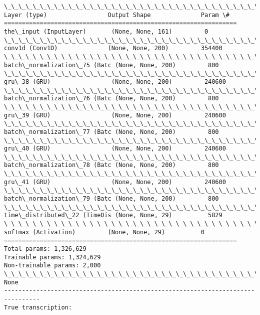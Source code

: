 \documentclass[11pt]{article}
\begin{document}
    \begin{Verbatim}[commandchars=\\\{\}]
\_\_\_\_\_\_\_\_\_\_\_\_\_\_\_\_\_\_\_\_\_\_\_\_\_\_\_\_\_\_\_\_\_\_\_\_\_\_\_\_\_\_\_\_\_\_\_\_\_\_\_\_\_\_\_\_\_\_\_\_\_\_\_\_\_
Layer (type)                 Output Shape              Param \#   
=================================================================
the\_input (InputLayer)       (None, None, 161)         0         
\_\_\_\_\_\_\_\_\_\_\_\_\_\_\_\_\_\_\_\_\_\_\_\_\_\_\_\_\_\_\_\_\_\_\_\_\_\_\_\_\_\_\_\_\_\_\_\_\_\_\_\_\_\_\_\_\_\_\_\_\_\_\_\_\_
conv1d (Conv1D)              (None, None, 200)         354400    
\_\_\_\_\_\_\_\_\_\_\_\_\_\_\_\_\_\_\_\_\_\_\_\_\_\_\_\_\_\_\_\_\_\_\_\_\_\_\_\_\_\_\_\_\_\_\_\_\_\_\_\_\_\_\_\_\_\_\_\_\_\_\_\_\_
batch\_normalization\_75 (Batc (None, None, 200)         800       
\_\_\_\_\_\_\_\_\_\_\_\_\_\_\_\_\_\_\_\_\_\_\_\_\_\_\_\_\_\_\_\_\_\_\_\_\_\_\_\_\_\_\_\_\_\_\_\_\_\_\_\_\_\_\_\_\_\_\_\_\_\_\_\_\_
gru\_38 (GRU)                 (None, None, 200)         240600    
\_\_\_\_\_\_\_\_\_\_\_\_\_\_\_\_\_\_\_\_\_\_\_\_\_\_\_\_\_\_\_\_\_\_\_\_\_\_\_\_\_\_\_\_\_\_\_\_\_\_\_\_\_\_\_\_\_\_\_\_\_\_\_\_\_
batch\_normalization\_76 (Batc (None, None, 200)         800       
\_\_\_\_\_\_\_\_\_\_\_\_\_\_\_\_\_\_\_\_\_\_\_\_\_\_\_\_\_\_\_\_\_\_\_\_\_\_\_\_\_\_\_\_\_\_\_\_\_\_\_\_\_\_\_\_\_\_\_\_\_\_\_\_\_
gru\_39 (GRU)                 (None, None, 200)         240600    
\_\_\_\_\_\_\_\_\_\_\_\_\_\_\_\_\_\_\_\_\_\_\_\_\_\_\_\_\_\_\_\_\_\_\_\_\_\_\_\_\_\_\_\_\_\_\_\_\_\_\_\_\_\_\_\_\_\_\_\_\_\_\_\_\_
batch\_normalization\_77 (Batc (None, None, 200)         800       
\_\_\_\_\_\_\_\_\_\_\_\_\_\_\_\_\_\_\_\_\_\_\_\_\_\_\_\_\_\_\_\_\_\_\_\_\_\_\_\_\_\_\_\_\_\_\_\_\_\_\_\_\_\_\_\_\_\_\_\_\_\_\_\_\_
gru\_40 (GRU)                 (None, None, 200)         240600    
\_\_\_\_\_\_\_\_\_\_\_\_\_\_\_\_\_\_\_\_\_\_\_\_\_\_\_\_\_\_\_\_\_\_\_\_\_\_\_\_\_\_\_\_\_\_\_\_\_\_\_\_\_\_\_\_\_\_\_\_\_\_\_\_\_
batch\_normalization\_78 (Batc (None, None, 200)         800       
\_\_\_\_\_\_\_\_\_\_\_\_\_\_\_\_\_\_\_\_\_\_\_\_\_\_\_\_\_\_\_\_\_\_\_\_\_\_\_\_\_\_\_\_\_\_\_\_\_\_\_\_\_\_\_\_\_\_\_\_\_\_\_\_\_
gru\_41 (GRU)                 (None, None, 200)         240600    
\_\_\_\_\_\_\_\_\_\_\_\_\_\_\_\_\_\_\_\_\_\_\_\_\_\_\_\_\_\_\_\_\_\_\_\_\_\_\_\_\_\_\_\_\_\_\_\_\_\_\_\_\_\_\_\_\_\_\_\_\_\_\_\_\_
batch\_normalization\_79 (Batc (None, None, 200)         800       
\_\_\_\_\_\_\_\_\_\_\_\_\_\_\_\_\_\_\_\_\_\_\_\_\_\_\_\_\_\_\_\_\_\_\_\_\_\_\_\_\_\_\_\_\_\_\_\_\_\_\_\_\_\_\_\_\_\_\_\_\_\_\_\_\_
time\_distributed\_22 (TimeDis (None, None, 29)          5829      
\_\_\_\_\_\_\_\_\_\_\_\_\_\_\_\_\_\_\_\_\_\_\_\_\_\_\_\_\_\_\_\_\_\_\_\_\_\_\_\_\_\_\_\_\_\_\_\_\_\_\_\_\_\_\_\_\_\_\_\_\_\_\_\_\_
softmax (Activation)         (None, None, 29)          0         
=================================================================
Total params: 1,326,629
Trainable params: 1,324,629
Non-trainable params: 2,000
\_\_\_\_\_\_\_\_\_\_\_\_\_\_\_\_\_\_\_\_\_\_\_\_\_\_\_\_\_\_\_\_\_\_\_\_\_\_\_\_\_\_\_\_\_\_\_\_\_\_\_\_\_\_\_\_\_\_\_\_\_\_\_\_\_
None
--------------------------------------------------------------------------------
True transcription:


\end{Verbatim}
\end{document}
